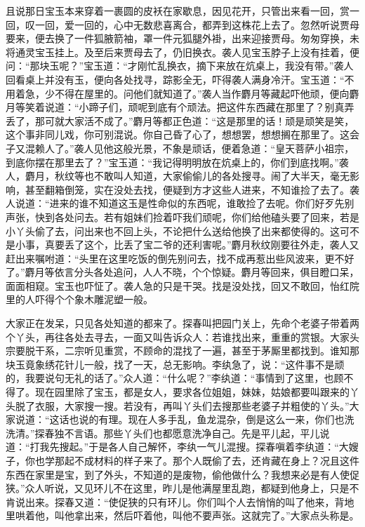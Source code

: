 \begin{parag}
    且说那日宝玉本来穿着一裹圆的皮袄在家歇息，因见花开，只管出来看一回，赏一回，叹一回，爱一回的，心中无数悲喜离合，都弄到这株花上去了。忽然听说贾母要来，便去换了一件狐腋箭袖，罩一件元狐腿外褂，出来迎接贾母。匆匆穿换，未将通灵宝玉挂上。及至后来贾母去了，仍旧换衣。袭人见宝玉脖子上没有挂着，便问：“那块玉呢？”宝玉道：“才刚忙乱换衣，摘下来放在炕桌上，我没有带。”袭人回看桌上并没有玉，便向各处找寻，踪影全无，吓得袭人满身冷汗。宝玉道：“不用着急，少不得在屋里的。问他们就知道了。”袭人当作麝月等藏起吓他顽，便向麝月等笑着说道：“小蹄子们，顽呢到底有个顽法。把这件东西藏在那里了？别真弄丢了，那可就大家活不成了。”麝月等都正色道：“这是那里的话！顽是顽笑是笑，这个事非同儿戏，你可别混说。你自己昏了心了，想想罢，想想搁在那里了。这会子又混赖人了。”袭人见他这般光景，不象是顽话，便着急道：“皇天菩萨小祖宗，到底你摆在那里去了？”宝玉道：“我记得明明放在炕桌上的，你们到底找啊。”袭人，麝月，秋纹等也不敢叫人知道，大家偷偷儿的各处搜寻。闹了大半天，毫无影响，甚至翻箱倒笼，实在没处去找，便疑到方才这些人进来，不知谁捡了去了。袭人说道：“进来的谁不知道这玉是性命似的东西呢，谁敢捡了去呢。你们好歹先别声张，快到各处问去。若有姐妹们捡着吓我们顽呢，你们给他磕头要了回来，若是小丫头偷了去，问出来也不回上头，不论把什么送给他换了出来都使得的。这可不是小事，真要丢了这个，比丢了宝二爷的还利害呢。”麝月秋纹刚要往外走，袭人又赶出来嘱咐道：“头里在这里吃饭的倒先别问去，找不成再惹出些风波来，更不好了。”麝月等依言分头各处追问，人人不晓，个个惊疑。麝月等回来，俱目瞪口呆，面面相窥。宝玉也吓怔了。袭人急的只是干哭。找是没处找，回又不敢回，怡红院里的人吓得个个象木雕泥塑一般。
\end{parag}


\begin{parag}
    大家正在发呆，只见各处知道的都来了。探春叫把园门关上，先命个老婆子带着两个丫头，再往各处去寻去，一面又叫告诉众人：若谁找出来，重重的赏银。大家头宗要脱干系，二宗听见重赏，不顾命的混找了一遍，甚至于茅厮里都找到。谁知那块玉竟象绣花针儿一般，找了一天，总无影响。李纨急了，说：“这件事不是顽的，我要说句无礼的话了。”众人道：“什么呢？”李纨道：“事情到了这里，也顾不得了。现在园里除了宝玉，都是女人，要求各位姐姐，妹妹，姑娘都要叫跟来的丫头脱了衣服，大家搜一搜。若没有，再叫丫头们去搜那些老婆子并粗使的丫头。”大家说道：“这话也说的有理。现在人多手乱，鱼龙混杂，倒是这么一来，你们也洗洗清。”探春独不言语。那些丫头们也都愿意洗净自己。先是平儿起，平儿说道：“打我先搜起。”于是各人自己解怀，李纨一气儿混搜。探春嗔着李纨道：“大嫂子，你也学那起不成材料的样子来了。那个人既偷了去，还肯藏在身上？况且这件东西在家里是宝，到了外头，不知道的是废物，偷他做什么？我想来必是有人使促狭。”众人听说，又见环儿不在这里，昨儿是他满屋里乱跑，都疑到他身上，只是不肯说出来。探春又道：“使促狭的只有环儿。你们叫个人去悄悄的叫了他来，背地里哄着他，叫他拿出来，然后吓着他，叫他不要声张。这就完了。”大家点头称是。
\end{parag}


